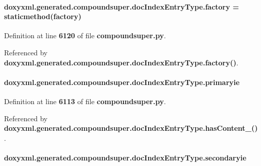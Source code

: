 \paragraph[{factory}]{\setlength{\rightskip}{0pt plus 5cm}doxyxml.\+generated.\+compoundsuper.\+doc\+Index\+Entry\+Type.\+factory = staticmethod(factory)\hspace{0.3cm}{\ttfamily [static]}}\label{classdoxyxml_1_1generated_1_1compoundsuper_1_1docIndexEntryType_a72e088675dcc079b40c236a62f9bd24f}


Definition at line {\bf 6120} of file {\bf compoundsuper.\+py}.



Referenced by {\bf doxyxml.\+generated.\+compoundsuper.\+doc\+Index\+Entry\+Type.\+factory()}.

\paragraph[{primaryie}]{\setlength{\rightskip}{0pt plus 5cm}doxyxml.\+generated.\+compoundsuper.\+doc\+Index\+Entry\+Type.\+primaryie}\label{classdoxyxml_1_1generated_1_1compoundsuper_1_1docIndexEntryType_aaf5f6c4884bcff88cf923f0d9e8bce9b}


Definition at line {\bf 6113} of file {\bf compoundsuper.\+py}.



Referenced by {\bf doxyxml.\+generated.\+compoundsuper.\+doc\+Index\+Entry\+Type.\+has\+Content\+\_\+()}.

\paragraph[{secondaryie}]{\setlength{\rightskip}{0pt plus 5cm}doxyxml.\+generated.\+compoundsuper.\+doc\+Index\+Entry\+Type.\+secondaryie}\label{classdoxyxml_1_1generated_1_1compoundsuper_1_1docIndexEntryType_a297030c3502b3efa626efa8388c8afb3}


